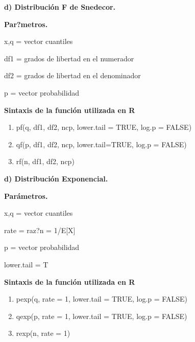 \documentclass[12pt,letterpaper]{article}\usepackage[]{graphicx}\usepackage[]{color}
\begin{document}
\begin{description}
  \item \textbf{d) Distribuci\'on F de Snedecor.}
\end{description}
\begin{itemize}
  \item \textbf{Par?metros.}
  \begin{center}
\item x,q = vector cuantiles
\item df1 = grados de libertad en el numerador
\item df2 = grados de libertad en el denominador 
\item p = vector probabilidad
\end{center}
\item \textbf{Sintaxis de la funci\'on utilizada en R}
\begin{enumerate}
  \item pf(q, df1, df2, ncp, lower.tail = TRUE, log.p = FALSE)
  \item qf(p, df1, df2, ncp, lower.tail=TRUE, log.p = FALSE) 
  \item rf(n, df1, df2, ncp) 
\end{enumerate}
\end{itemize}

\begin{description}
  \item \textbf{d) Distribuci\'on Exponencial.}
\end{description}
\begin{itemize}
  \item \textbf{Par\'ametros.}
  \begin{center}
\item x,q = vector cuantiles
\item rate = raz?n = 1/E[X]
\item p = vector probabilidad 
\item lower.tail = T 
\end{center}
\item \textbf{Sintaxis de la funci\'on utilizada en R}
\begin{enumerate}
  \item pexp(q, rate = 1, lower.tail = TRUE, log.p = FALSE)
  \item qexp(p, rate = 1, lower.tail = TRUE, log.p = FALSE)
  \item rexp(n, rate = 1)  
\end{enumerate}
\end{itemize}
\end{document}
